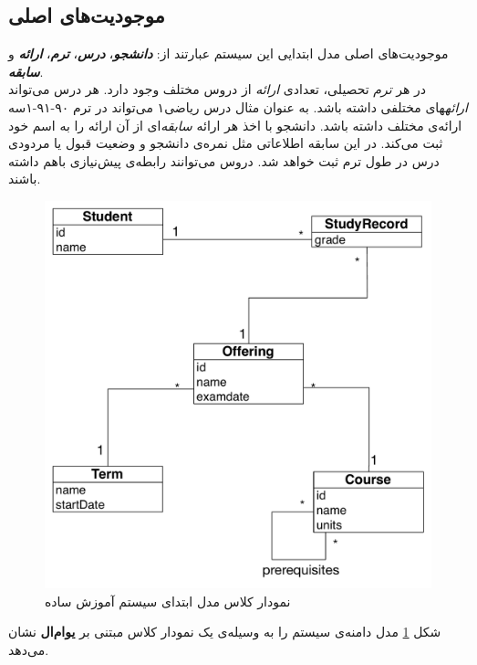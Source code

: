\subsection{موجودیت‌های اصلی}
\label{subsec:mainEntities}
 موجودیت‌های اصلی  مدل ابتدایی این سیستم عبارتند از:
\textbf{\textit{دانشجو}}، \textbf{\textit{درس}}، \textbf{\textit{ترم}}، \textbf{\textit{ارائه}} و \textbf{\textit{سابقه}}.\\
در هر \textit{ترم} تحصیلی، تعدادی \textit{ارائه} از دروس مختلف وجود دارد. هر درس می‌تواند \textit{ارائه}های مختلفی داشته باشد. به عنوان مثال درس ریاضی۱ می‌تواند در ترم ۹۰-۹۱-۱سه ارائه‌ی مختلف داشته باشد. دانشجو با اخذ هر ارائه \textit{سابقه}‌ای از آن ارائه را به اسم خود ثبت می‌کند. در این سابقه اطلاعاتی مثل نمره‌ی دانشجو و وضعیت قبول یا مردودی درس در طول ترم ثبت خواهد شد. دروس می‌توانند رابطه‌ی پیش‌نیازی باهم داشته باشند. 
\begin{figure}
    \begin{center}
	\includegraphics[width=12cm]{4-ProposedFramework/Figures/SimpleClassDiagram.pdf}
    \end{center}
    \caption{\label{fig:edu_class1} نمودار کلاس مدل ابتدای سیستم آموزش ساده }
\end{figure}
شکل \ref{fig:edu_class1} مدل دامنه‌ی سیستم را به وسیله‌ی یک نمودار کلاس مبتنی بر \textbf{یو‌ام‌ال} نشان می‌دهد.

